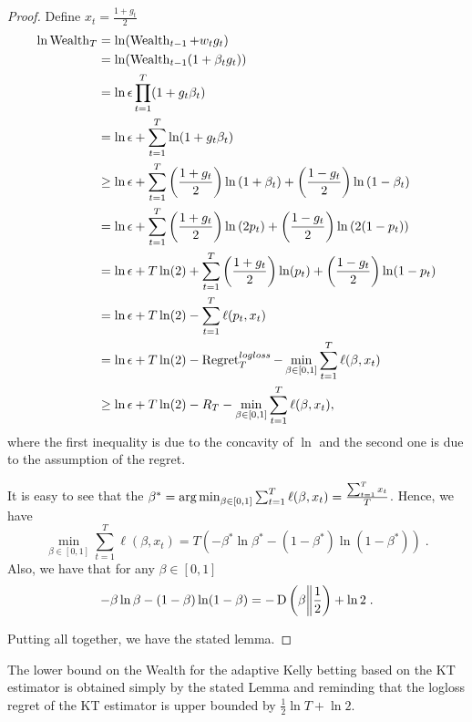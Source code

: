 \begin{proof}
Define $x_t=\tfrac{1+g_t}{2}$
\begin{align*}
\ln \operatorname{Wealth}_T
& = \ln (\operatorname{Wealth}_{t-1} + w_t g_t) \\
& = \ln  (\operatorname{Wealth}_{t-1}(1 + \beta_t g_t))\\
& = \ln \epsilon \prod_{t=1}^T (1 + g_t\beta_t) \\
& = \ln \epsilon + \sum_{t=1}^T \ln (1 + g_t\beta_t)\\
& \ge \ln \epsilon +  \sum_{t=1}^T \left( \frac{1+g_t}{2} \right) \ln \left(1 + \beta_t\right) + \left( \frac{1-g_t}{2} \right) \ln \left(1 - \beta_t \right) \\
& =  \ln \epsilon + \sum_{t=1}^T \left( \frac{1+g_t}{2} \right) \ln \left(2p_t \right) + \left( \frac{1-g_t}{2} \right) \ln \left(2 (1 - p_t) \right) \\
& =  \ln \epsilon + T \ln(2) + \sum_{t=1}^T \left( \frac{1+g_t}{2} \right) \ln (p_t) + \left( \frac{1-g_t}{2} \right) \ln (1 - p_t) \\
& =  \ln \epsilon + T \ln(2) - \sum_{t=1}^T \ell(p_t, x_t) \\
& =  \ln \epsilon + T \ln(2) - \operatorname{Regret}^{logloss}_T - \min_{\beta \in [0,1]} \sum_{t=1}^T \ell(\beta,x_t) \\
& \geq  \ln \epsilon + T \ln(2) - R_T - \min_{\beta \in [0,1]} \sum_{t=1}^T \ell(\beta,x_t),
\end{align*}
where the first inequality is due to the concavity of $\ln$ and the second one is due to the assumption of the regret.

It is easy to see that the $\beta^*=\operatorname*{arg\,min}_{\beta \in [0,1]} \sum_{t=1}^T \ell(\beta,x_t)=\tfrac{\sum_{t=1}^T x_t}{T}$. Hence, we have
\[
\min_{\beta \in [0,1]} \sum_{t=1}^T \ell(\beta,x_t) = T \left( - \beta^* \ln \beta^* - (1-\beta^*) \ln (1-\beta^*)\right) \; .
\]
Also, we have that for any $\beta \in [0,1]$
\[
- \beta \ln \beta - (1-\beta) \ln (1-\beta) = - \operatorname{D}\left({\beta}\middle\|{\frac{1}{2}}\right) + \ln 2 \; .
\]

Putting all together, we have the stated lemma.
\end{proof} 

The lower bound on the Wealth for the adaptive Kelly betting based on the KT estimator is obtained simply by the stated Lemma and reminding that the logloss regret of the KT estimator is upper bounded by $\frac{1}{2}\ln T + \ln 2$. 